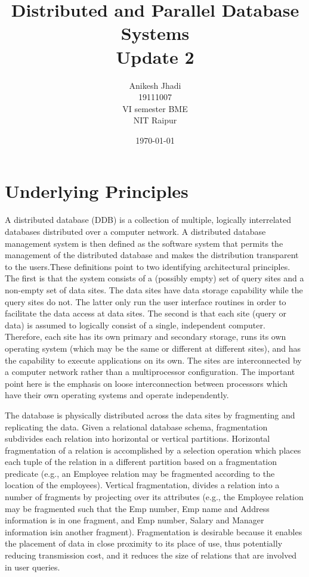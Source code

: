 \documentclass{article}
\title{Distributed and Parallel Database Systems\\Update 2}
\author{Anikesh Jhadi \\19111007 \\VI semester BME \\NIT Raipur}
\date{\today}
\begin{document}
\maketitle

\section{Underlying Principles}
A distributed database (DDB) is a collection of multiple, logically interrelated databases distributed over
a computer network. A distributed database management system is then defined as the software system that permits the management of the distributed database and makes the distribution
transparent to the users.These definitions point to two identifying architectural principles. The first is that the system consists of a (possibly empty) set of query sites and a non-empty set of data sites. The data sites have data storage capability while the query sites do not. The latter only
run the user interface routines in order to facilitate the data access at data sites. The second is that each
site (query or data) is assumed to logically consist of a single, independent computer. Therefore, each
site has its own primary and secondary storage, runs its own operating system (which may be the same
or different at different sites), and has the capability to execute applications on its own. The sites are
interconnected by a computer network rather than a multiprocessor configuration. The important point here
is the emphasis on loose interconnection between processors which have their own operating systems and
operate independently.

The database is physically distributed across the data sites by fragmenting and replicating the data. Given a relational database schema, fragmentation subdivides each relation into horizontal or vertical partitions. Horizontal fragmentation of a relation is accomplished by a selection operation
which places each tuple of the relation in a different partition based on a fragmentation predicate (e.g., an
Employee relation may be fragmented according to the location of the employees). Vertical fragmentation,
divides a relation into a number of fragments by projecting over its attributes (e.g., the Employee relation
may be fragmented such that the Emp number, Emp name and Address information is in one fragment,
and Emp number, Salary and Manager information isin another fragment). Fragmentation is desirable
because it enables the placement of data in close proximity to its place of use, thus potentially reducing
transmission cost, and it reduces the size of relations that are involved in user queries.
\end{document}
